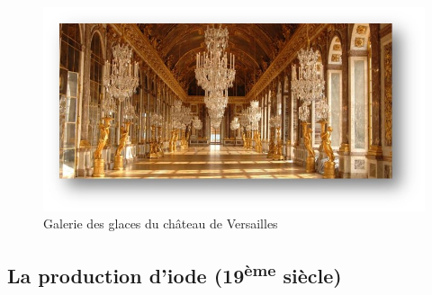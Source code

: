 \documentclass[
]{book}
\begin{document}
\begin{figure}

{\centering \includegraphics{images/galerie des glaces} 

}

\caption{Galerie des glaces du château de Versailles}\label{fig:versailles}
\end{figure}

\hypertarget{la-production-diode-19uxe8me-siuxe8cle}{%
\subsection{\texorpdfstring{La production d'iode (19\textsuperscript{ème} siècle)}{La production d'iode (19ème siècle)}}\label{la-production-diode-19uxe8me-siuxe8cle}}
\end{document}
